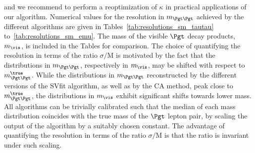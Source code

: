 and we recommend to perform a reoptimization of $\kappa$ in practical applications of our algorithm.
Numerical values for the resolution in $m_{\Pgt\Pgt}$ achieved by the different algorithms are given in Tables~\ref{tab:resolutions_sm_tautau} to~\ref{tab:resolutions_sm_emu}.
The mass of the visible $\Pgt$ decay products, $m_{\vis}$, is included in the Tables for comparison.
The choice of quantifying the resolution in terms of the ratio $\sigma/\textrm{M}$ is motivated 
by the fact that the distributions in $m_{\Pgt\Pgt}$, respectively in $m_{\vis}$, may be shifted with respect to $m_{\Pgt\Pgt}^{\true}$.
While the distributions in $m_{\Pgt\Pgt}$ reconstructed by the different versions of the SVfit algorithm,
as well as by the CA method, peak close to $m_{\Pgt\Pgt}^{\true}$,
the distributions in $m_{\vis}$ exhibit significant shifts towards lower mass.
All algorithms can be trivially calibrated such that the median of each mass distribution coincides with the true mass of the $\Pgt$ lepton pair,
by scaling the output of the algorithm by a suitably chosen constant.
The advantage of quantifying the resolution in terms of the ratio $\sigma/\textrm{M}$ is that the ratio
is invariant under such scaling.

